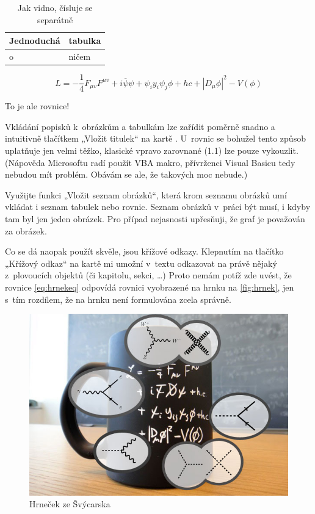 \begin{table}[h]
  \centering
    \begin{tabular}{|l|l|}
    \hline
    Jednoduchá & tabulka \\ \hline
    o~& ničem \\
    \hline
    \end{tabular}
  \caption{Jak vidno, čísluje se separátně}
\end{table}

\begin{listedequation}[h]
$$L = - \frac{1}{4}F_{{\mu}v}F^{{\mu}v} + i \overline{\psi} \psi + \psi_i y_i \psi_j \phi + hc + |D_\mu\phi|^2 - V(\phi)$$
\caption{To je ale rovnice!}
\label{eq:hrnekeq}
\end{listedequation}

Vkládání popisků k~obrázkům a tabulkám lze zařídit poměrně snadno a intuitivně tlačítkem „Vložit titulek“ na kartě .
U~rovnic se bohužel tento způsob uplatňuje jen velmi těžko, klasické vpravo zarovnané (1.1) lze pouze vykouzlit.
(Nápověda Microsoftu radí použít VBA makro, přívrženci Visual Basicu tedy nebudou mít problém.
Obávám se ale, že takových moc nebude.)

Využijte funkci „Vložit seznam obrázků“, která krom seznamu obrázků umí vkládat i seznam tabulek nebo rovnic.
Seznam obrázků v~práci být musí, i kdyby tam byl jen jeden obrázek.
Pro případ nejasnosti upřesňuji, že graf je považován za obrázek.

Co se dá naopak použít skvěle, jsou křížové odkazy.
Klepnutím na tlačítko „Křížový odkaz“ na kartě  mi umožní v~textu odkazovat na právě nějaký z~plovoucích objektů (či kapitolu, sekci, …) Proto nemám potíž zde uvést, že rovnice \autoref{eq:hrnekeq} odpovídá rovnici vyobrazené na hrnku na \autoref{fig:hrnek}, jen s~tím rozdílem, že na hrnku není formulována zcela správně.

\begin{figure}[h]
  	\centering
 	\includegraphics[width=\textwidth]{img/hrnek.jpg}
 	\caption{Hrneček ze Švýcarska}
 	\label{fig:hrnek}
\end{figure}


